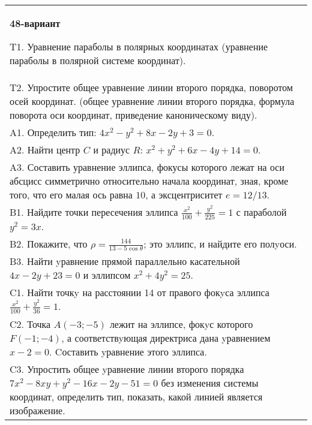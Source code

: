 \documentclass{article}
\begin{document}
\begin{tabular}{m{17cm}}
\textbf{48-вариант}
\newline

T1. Уравнение параболы в полярных координатах (уравнение параболы в полярной системе координат).\\

T2. Упростите общее уравнение линии второго порядка, поворотом осей координат. (общее уравнение линии второго порядка, формула поворота оси координат, приведение каноническому виду).\\

A1. Определить тип: $4x^{2}-y^{2}+8x-2y+3=0$.\\

A2. Найти центр $C$ и радиус $R$: $x^2+y^2+6x-4y+14=0$.\\

A3. Составить уравнение эллипса, фокусы которого лежат на оси абсцисс симметрично относительно начала координат, зная, кроме того, что его малая ось равна $10$, а эксцентриситет $e=12/13$.\\

B1. Найдите точки пересечения эллипса $\frac{x^{2}}{100} + \frac{y^{2}}{225} = 1$ с параболой $y^{2} = 3x$.\\

B2. Покажите, что $\rho = \frac{144}{13 - 5\cos\theta}$; это эллипс, и найдите его полyоси.\\

B3. Найти yравнение прямой параллельно касательной $4x - 2y + 23 = 0$ и эллипсом $x^{2} + 4y^{2} = 25$.  \\

C1. Найти точкy на расстоянии 14 от правого фокyса эллипса $\frac{x^{2}}{100}+\frac{y^{2}}{36}=1$.\\

C2. Точка $A(-3;-5)$ лежит на эллипсе, фокyс которого $F(-1;-4)$, а соответствyющая директриса дана yравнением $x-2=0$. Cоставить yравнение этого эллипса.  \\

C3. Упростить общее yравнение линии второго порядка $7x^{2}-8xy+y^{2}-16x-2y-51=0$ без изменения системы координат, определить тип, показать, какой линией является изображение.\\

\end{tabular}
\vspace{1cm}
\end{document}
